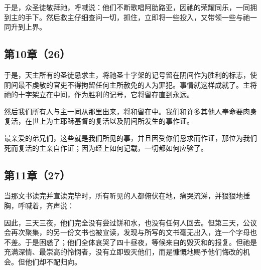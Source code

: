 于是，众圣徒敬拜祂，呼喊说：他们不断歌唱阿肋路亚，因祂的荣耀同乐，一同拥到主的手下。然后救主仔细查问一切，抓住，立即将一些投入，又带领一些与祂一同升到上界。\par


\subsection{第10章（26）}

于是，天主所有的圣徒恳求主，将祂圣十字架的记号留在阴间作为胜利的标志，使阴间最不虔敬的官吏不得拘留任何主所赦免的人为罪犯。事情就这样成就了。主将祂的十字架立在中间，作为胜利的记号，它将留存直到永远。\par

然后我们所有人与主一同从那里出来，将和留在中。我们和许多其他人奉命要肉身复活，在世上为主耶稣基督的复活以及阴间所发生的事作证。\par

最亲爱的弟兄们，这些就是我们所见的事，并且因受你们恳求而作证，那位为我们死而复活的主亲自作证；因为经上如何记载，一切都如何应验了。\par


\subsection{第11章（27）}

当那文书读完并宣读完毕时，所有听见的人都俯伏在地，痛哭流涕，并狠狠地捶胸，呼喊着，齐声说：\par

因此，三天三夜，他们完全没有尝过饼和水，也没有任何人回去。但第三天，公议会再次聚集，的另一份文书也被宣读，发现与所写的文书毫无出入，连一个字母也不差。于是困惑了；他们全体哀哭了四十昼夜，等候来自的毁灭和的报复。但祂是充满深情、最崇高的怜悯者，没有立即毁灭他们，而是慷慨地赐予他们悔改的机会。但他们却不配归向。\par

